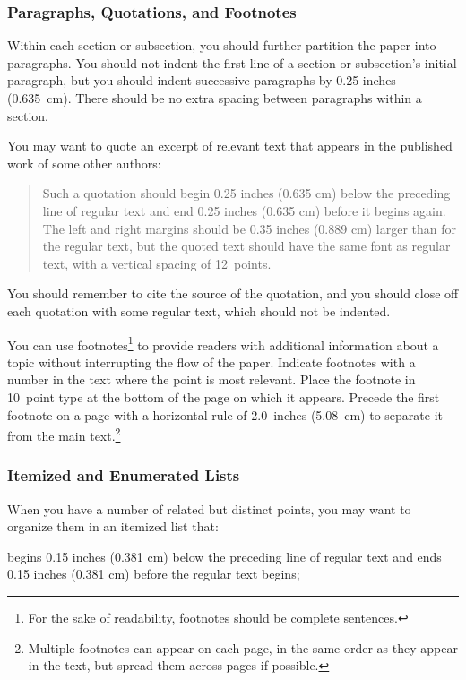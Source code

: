 \documentclass[11pt,letterpaper]{article}
\begin{document}
\subsubsection{Paragraphs, Quotations, and Footnotes}

Within each section or subsection, you should further partition 
the paper into paragraphs. You should not indent the first line 
of a section or subsection's initial paragraph, but you should
indent successive paragraphs by 0.25 inches (0.635~cm). There 
should be no extra spacing between paragraphs within a section. 
 
You may want to quote an excerpt of relevant text that appears in 
the published work of some other authors: 

\begin{quote}
Such a quotation should begin 0.25 inches (0.635 cm) below the preceding 
line of regular text and end 0.25 inches (0.635 cm) before it begins
again. The left and right margins should be 0.35 inches (0.889 cm) larger 
than for the regular text, but the quoted text should have the same
font as regular text, with a vertical spacing of 12~points.
\end{quote}

\noindent
You should remember to cite the source of the quotation, and you should 
close off each quotation with some regular text, which should not be
indented.

You can use footnotes\footnote{For the sake of readability, footnotes
should be complete sentences.} to provide readers with additional
information about a topic without interrupting the flow of the paper.
Indicate footnotes with a number in the text where the point is most
relevant. Place the footnote in 10~point type at the bottom of the
page on which it appears. Precede the first footnote on a page 
with a horizontal rule of 2.0~inches (5.08~cm) to separate it from 
the main text.\footnote{Multiple footnotes can appear on each page, 
in the same order as they appear in the text, but spread them across
pages if possible.}

\subsubsection{Itemized and Enumerated Lists}

When you have a number of related but distinct points, you may want
to organize them in an itemized list that: 

\vskip 0.05in

\cbullet 
begins 0.15 inches (0.381 cm) below the preceding line of regular text 
and ends 0.15 inches (0.381 cm) before the regular text begins; 
\end{document}
